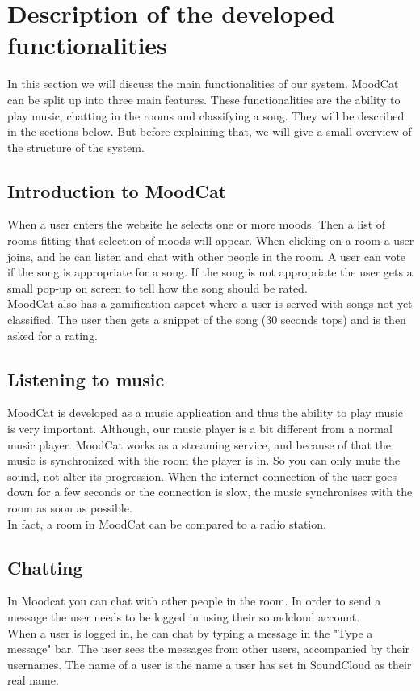 \chapter{Description of the developed functionalities}

In this section we will discuss the main functionalities of our system.
MoodCat can be split up into three main features.
These functionalities are the ability to play music, chatting in the rooms and classifying a song.
They will be described in the sections below.
But before explaining that, we will give a small overview of the structure of the system.

\section{Introduction to MoodCat}
When a user enters the website he selects one or more moods. 
Then a list of rooms fitting that selection of moods will appear.
When clicking on a room a user joins, and he can listen and chat with other people in the room.
A user can vote if the song is appropriate for a song. If the song is not appropriate the user gets a small pop-up on screen to tell how the song should be rated.
\\
MoodCat also has a gamification aspect where a user is served with songs not yet classified. The user then gets a snippet of the song (30 seconds tops) and is then asked for a rating.

\section{Listening to music}
MoodCat is developed as a music application and thus the ability to play music is very important.
Although, our music player is a bit different from a normal music player.
MoodCat works as a streaming service, and because of that the music is synchronized with the room the player is in.  
So you can only mute the sound, not alter its progression.
When the internet connection of the user goes down for a few seconds or the connection is slow, the music synchronises with the room as soon as possible.\\
In fact, a room in MoodCat can be compared to a radio station.

\section{Chatting}
In Moodcat you can chat with other people in the room.
In order to send a message the user needs to be logged in using their soundcloud account.
\\
When a user is logged in, he can chat by typing a message in the "Type a message" bar.
The user sees the messages from other users, accompanied by their usernames.
The name of a user is the name a user has set in SoundCloud as their real name.

